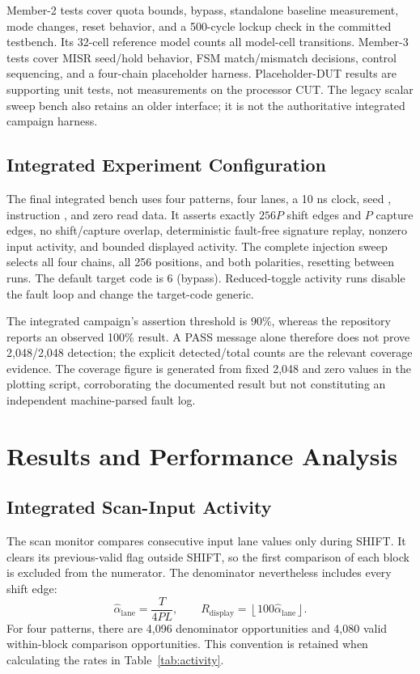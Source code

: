 \documentclass[conference,a4paper]{IEEEtran}
\newcommand{\rtl}[1]{\texttt{\detokenize{#1}}}
\begin{document}
Member-2 tests cover quota bounds, bypass, standalone baseline measurement,
mode changes, reset behavior, and a 500-cycle lockup check in the committed
testbench. Its 32-cell reference model counts all model-cell transitions.
Member-3 tests cover MISR seed/hold behavior, FSM match/mismatch decisions,
control sequencing, and a four-chain placeholder harness. Placeholder-DUT
results are supporting unit tests, not measurements on the processor CUT.
The legacy scalar sweep bench also retains an older interface; it is not the
authoritative integrated campaign harness.

\subsection{Integrated Experiment Configuration}
The final integrated bench uses four patterns, four lanes, a 10 ns clock,
seed \rtl{0x1ACEB00C}, instruction \rtl{0x24010001}, and zero read data.
It asserts exactly $256P$ shift edges and $P$ capture edges, no shift/capture
overlap, deterministic fault-free signature replay, nonzero input activity,
and bounded displayed activity. The complete injection sweep selects all
four chains, all 256 positions, and both polarities, resetting between runs.
The default target code is 6 (bypass). Reduced-toggle activity runs disable
the fault loop and change the target-code generic.

The integrated campaign's assertion threshold is 90\%, whereas the repository
reports an observed 100\% result. A PASS message alone therefore does not prove
2,048/2,048 detection; the explicit detected/total counts are the relevant
coverage evidence. The coverage figure is generated from fixed 2,048 and zero
values in the plotting script, corroborating the documented result but not
constituting an independent machine-parsed fault log.

\section{Results and Performance Analysis}
\subsection{Integrated Scan-Input Activity}
The scan monitor compares consecutive input lane values only during SHIFT.
It clears its previous-valid flag outside SHIFT, so the first comparison of
each block is excluded from the numerator. The denominator nevertheless
includes every shift edge:
\begin{equation}
 \hat\alpha_{\mathrm{lane}}=\frac{T}{4PL},\qquad
 R_{\mathrm{display}}=\left\lfloor100\hat\alpha_{\mathrm{lane}}\right\rfloor.
\label{eq:activity}
\end{equation}
For four patterns, there are 4,096 denominator opportunities and 4,080 valid
within-block comparison opportunities. This convention is retained when
calculating the rates in Table~\ref{tab:activity}.
\end{document}
